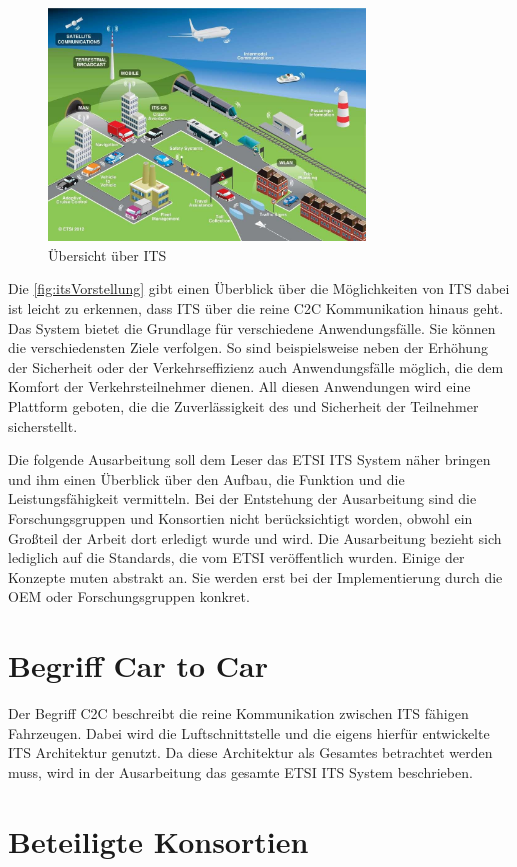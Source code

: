 \begin{figure}[h]
	\includegraphics[width=0.75\textwidth]{content/images/00_einleitung/ETSI_ITS_09_2012.jpg}
	\caption{Übersicht über ITS \cite{ITS_vorstellung}}
	\label{fig:itsVorstellung}
\end{figure}

Die \autoref{fig:itsVorstellung} gibt einen Überblick über die Möglichkeiten von \ac{ITS} dabei ist leicht zu erkennen, dass \ac{ITS} über die reine \ac{C2C} Kommunikation hinaus geht. Das System bietet die Grundlage für verschiedene Anwendungsfälle. Sie können die verschiedensten Ziele verfolgen. So sind beispielsweise neben der Erhöhung der Sicherheit oder der Verkehrseffizienz auch Anwendungsfälle möglich, die dem Komfort der Verkehrsteilnehmer dienen. All diesen Anwendungen wird eine Plattform geboten, die die Zuverlässigkeit des und Sicherheit der Teilnehmer sicherstellt.

Die folgende Ausarbeitung soll dem Leser das \ac{ETSI} \ac{ITS} System näher bringen und ihm einen Überblick über den Aufbau, die Funktion und die Leistungsfähigkeit vermitteln. Bei der Entstehung der Ausarbeitung sind die Forschungsgruppen und Konsortien nicht berücksichtigt worden, obwohl ein Großteil der Arbeit dort erledigt wurde und wird. Die Ausarbeitung bezieht sich lediglich auf die Standards, die vom \ac{ETSI} veröffentlich wurden. Einige der Konzepte muten abstrakt an. Sie werden erst bei der Implementierung durch die \ac{OEM} oder Forschungsgruppen konkret.

\section{Begriff Car to Car}
Der Begriff \ac{C2C} beschreibt die reine Kommunikation zwischen \ac{ITS} fähigen Fahrzeugen. Dabei wird die Luftschnittstelle und die eigens hierfür entwickelte \ac{ITS} Architektur genutzt. Da diese Architektur als Gesamtes betrachtet werden muss, wird in der Ausarbeitung das gesamte \ac{ETSI} \ac{ITS} System beschrieben.  



\section{Beteiligte Konsortien}

